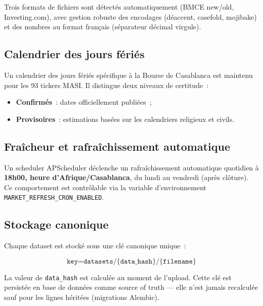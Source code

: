 Trois formats de fichiers sont détectés automatiquement (BMCE new/old, Investing.com),
avec gestion robuste des encodages (déaccent, casefold, mojibake) et des nombres
au format français (séparateur décimal virgule).

\subsection{Calendrier des jours fériés}

Un calendrier des jours fériés spécifique à la Bourse de Casablanca est maintenu
pour les 93 tickers MASI. Il distingue deux niveaux de certitude~:
\begin{itemize}
    \item \textbf{Confirmés}~: dates officiellement publiées~;
    \item \textbf{Provisoires}~: estimations basées sur les calendriers religieux et civils.
\end{itemize}

\subsection{Fraîcheur et rafraîchissement automatique}

Un scheduler APScheduler déclenche un rafraîchissement automatique quotidien à
\textbf{18h00, heure d'Afrique/Casablanca}, du lundi au vendredi (après clôture).
Ce comportement est contrôlable via la variable d'environnement
\texttt{MARKET\_REFRESH\_CRON\_ENABLED}.

\subsection{Stockage canonique}

Chaque dataset est stocké sous une clé canonique unique~:

\begin{equation}
\texttt{key} = \texttt{datasets/\{data\_hash\}/\{filename\}}
\label{eq:canonical_key}
\end{equation}

La valeur de \texttt{data\_hash} est calculée au moment de l'upload. Cette clé
est persistée en base de données comme \og source of truth \fg{} — elle n'est
jamais recalculée sauf pour les lignes héritées (migrations Alembic).


